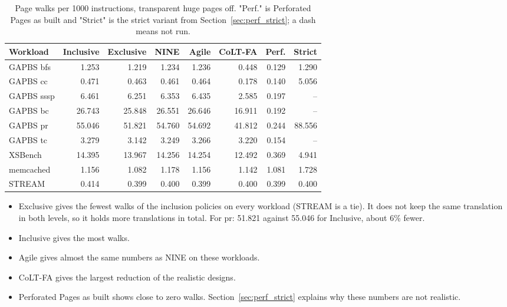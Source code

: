 \begin{table}[htbp]
\centering
\small
\caption{Page walks per 1000 instructions, transparent huge pages off. "Perf." is Perforated Pages as built and "Strict" is the strict variant from Section~\ref{sec:perf_strict}; a dash means not run.}
\label{tab:thpoff_all}
\begin{tabular}{l r r r r r r r}
\toprule
\textbf{Workload} & \textbf{Inclusive} & \textbf{Exclusive} & \textbf{NINE} & \textbf{Agile} & \textbf{CoLT-FA} & \textbf{Perf.} & \textbf{Strict} \\
\midrule
GAPBS bfs & 1.253 & 1.219 & 1.234 & 1.236 & 0.448 & 0.129 & 1.290 \\
GAPBS cc & 0.471 & 0.463 & 0.461 & 0.464 & 0.178 & 0.140 & 5.056 \\
GAPBS sssp & 6.461 & 6.251 & 6.353 & 6.435 & 2.585 & 0.197 & -- \\
GAPBS bc & 26.743 & 25.848 & 26.551 & 26.646 & 16.911 & 0.192 & -- \\
GAPBS pr & 55.046 & 51.821 & 54.760 & 54.692 & 41.812 & 0.244 & 88.556 \\
GAPBS tc & 3.279 & 3.142 & 3.249 & 3.266 & 3.220 & 0.154 & -- \\
XSBench & 14.395 & 13.967 & 14.256 & 14.254 & 12.492 & 0.369 & 4.941 \\
memcached & 1.156 & 1.082 & 1.178 & 1.156 & 1.142 & 1.081 & 1.728 \\
STREAM & 0.414 & 0.399 & 0.400 & 0.399 & 0.400 & 0.399 & 0.400 \\
\bottomrule
\end{tabular}
\end{table}

\begin{itemize}
    \item Exclusive gives the fewest walks of the inclusion policies on every workload (STREAM is a tie). It does not keep the same translation in both levels, so it holds more translations in total. For pr: 51.821 against 55.046 for Inclusive, about 6\% fewer.
    \item Inclusive gives the most walks.
    \item Agile gives almost the same numbers as NINE on these workloads.
    \item CoLT-FA gives the largest reduction of the realistic designs.
    \item Perforated Pages as built shows close to zero walks. Section~\ref{sec:perf_strict} explains why these numbers are not realistic.
\end{itemize}

